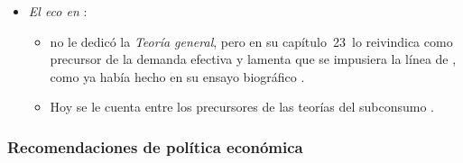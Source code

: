 \documentclass[11pt]{article}
\begin{document}
\begin{itemize}
  \begin{itemize}
  \item {} responde que lo ahorrado se invierte y se gasta igual (\ref{sec:say}).
  \item {} no tenía una teoría del atesoramiento ni del tipo de interés que explicara por qué el ahorro podía no gastarse, y perdió el debate.
  \item Discrepan también en las Leyes de Granos:  defiende la protección y , el grano barato\nocite{Ricardo1815Essay}.
  \end{itemize}
\item \emph{El eco en }:
  \begin{itemize}
  \item {} no le dedicó la \emph{Teoría general}, pero en su capítulo~23~lo reivindica como precursor de la demanda efectiva y lamenta que se impusiera la línea de \nocite{Keynes1936}, como ya había hecho en su ensayo biográfico\nocite{Keynes1933Essays} .
  \item Hoy se le cuenta entre los precursores de las teorías del subconsumo .
  \end{itemize}
\end{itemize}

\subsubsection{Recomendaciones de política económica}\label{sec:malthus-politica}
\end{document}

